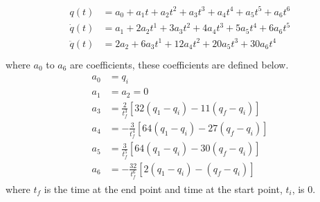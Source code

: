             \begin{align} \label{eq:polinomials}
                \begin{split}
                    q(t) &= a_0 + a_1t + a_2t^2 + a_3t^3 + a_4t^4 +a_5t^5 + a_6t^6 \\
                    \dot{q}(t) &= a_1 + 2a_2t^1 + 3a_3t^2 + 4a_4t^3 + 5a_5t^4 + 6a_6t^5 \\
                    \ddot{q}(t) &= 2a_2 + 6a_3t^1 + 12a_4t^2 + 20a_5t^3 + 30a_6t^4 \\
                \end{split}
            \end{align}
            where \(a_0\) to \(a_6\) are coefficients, these coefficients are defined below.
            \begin{align}
                \begin{split}
                    a_0 &= q_i \\
                    a_1 &= a_2 = 0 \\
                    a_3 &= \frac{2}{t^3_f}[32(q_1-q_i)-11(q_f-q_i)] \\
                    a_4 &= -\frac{3}{t^4_f}[64(q_1-q_i)-27(q_f-q_i)] \\
                    a_5 &= \frac{3}{t^5_f}[64(q_1-q_i)-30(q_f-q_i)] \\
                    a_6 &= -\frac{32}{t^6_f}[2(q_1-q_i)-(q_f-q_i)]
                \end{split}
            \end{align}
            where \(t_f\) is the time at the end point and time at the start point, \(t_i\), is \(0\).




